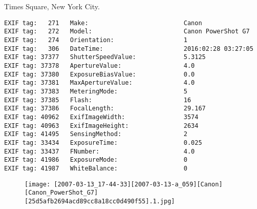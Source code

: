 \section{\protect{}}
\noindent Times Square, New York City.
\noindent
\begin{lstlisting}
EXIF tag:   271   Make:                          Canon
EXIF tag:   272   Model:                         Canon PowerShot G7
EXIF tag:   274   Orientation:                   1
EXIF tag:   306   DateTime:                      2016:02:28 03:27:05
EXIF tag: 37377   ShutterSpeedValue:             5.3125
EXIF tag: 37378   ApertureValue:                 4.0
EXIF tag: 37380   ExposureBiasValue:             0.0
EXIF tag: 37381   MaxApertureValue:              4.0
EXIF tag: 37383   MeteringMode:                  5
EXIF tag: 37385   Flash:                         16
EXIF tag: 37386   FocalLength:                   29.167
EXIF tag: 40962   ExifImageWidth:                3574
EXIF tag: 40963   ExifImageHeight:               2634
EXIF tag: 41495   SensingMethod:                 2
EXIF tag: 33434   ExposureTime:                  0.025
EXIF tag: 33437   FNumber:                       4.0
EXIF tag: 41986   ExposureMode:                  0
EXIF tag: 41987   WhiteBalance:                  0

\end{lstlisting}
\clearpage
\begin{figure}
\raggedleft
\texttt{[image: [2007-03-13\_17-44-33][2007-03-13-a\_059][Canon][Canon\_PowerShot\_G7][25d5afb2694acd89cc8a18cc0d490f55].1.jpg]}
\end{figure}


\clearpage
